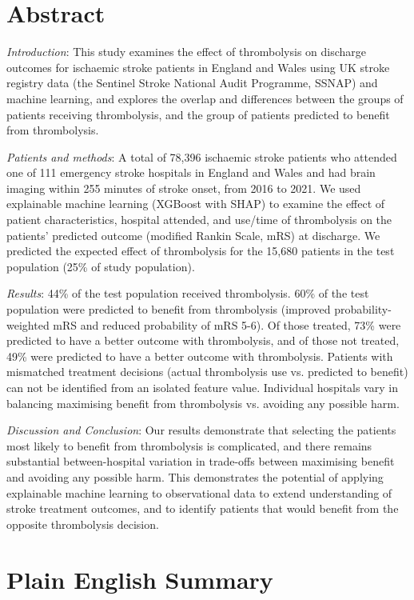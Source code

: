 \section*{Abstract}

\textit{Introduction}: This study examines the effect of thrombolysis on discharge outcomes for ischaemic stroke patients in England and Wales using UK stroke registry data (the Sentinel Stroke National Audit Programme, SSNAP) and machine learning, and explores the overlap and differences between the groups of patients receiving thrombolysis, and the group of patients predicted to benefit from thrombolysis.

\textit{Patients and methods}:  A total of 78,396 ischaemic stroke patients who attended one of 111 emergency stroke hospitals in England and Wales and had brain imaging within 255 minutes of stroke onset, from 2016 to 2021. We used explainable machine learning (XGBoost with SHAP) to examine the effect of patient characteristics, hospital attended, and use/time of thrombolysis on the patients’ predicted outcome (modified Rankin Scale, mRS) at discharge. We predicted the expected effect of thrombolysis for the 15,680 patients in the test population (25\% of study population).

\textit{Results}: 44\% of the test population received thrombolysis. 60\% of the test population were predicted to benefit from thrombolysis (improved probability-weighted mRS and reduced probability of mRS 5-6). Of those treated, 73\% were predicted to have a better outcome with thrombolysis, and of those not treated, 49\% were predicted to have a better outcome with thrombolysis. Patients with mismatched treatment decisions (actual thrombolysis use vs. predicted to benefit) can not be identified from an isolated feature value. Individual hospitals vary in balancing maximising benefit from thrombolysis vs. avoiding any possible harm.

\textit{Discussion and Conclusion}: Our results demonstrate that selecting the patients most likely to benefit from thrombolysis is complicated, and there remains substantial between-hospital variation in trade-offs between maximising benefit and avoiding any possible harm. This demonstrates the potential of applying explainable machine learning to observational data to extend understanding of stroke treatment outcomes, and to identify patients that would benefit from the opposite thrombolysis decision.

\section*{Plain English Summary}

